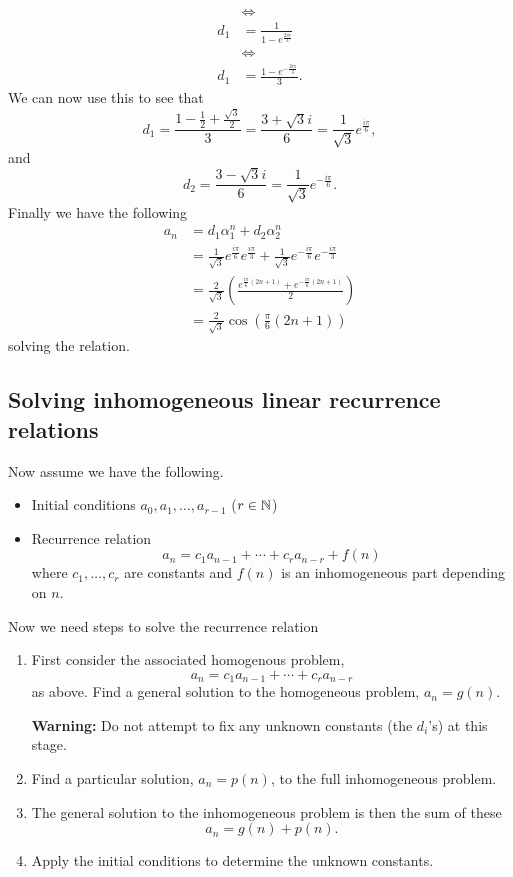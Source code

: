 \documentclass[10pt, a4paper]{article}
\begin{document}
\begin{example}
\begin{solution}
\begin{align*}
            &\iff \\
            d_1 &= \frac{1}{1 - e ^ {\frac{2i\pi}{3}}} \\
            &\iff \\
            d_1 &= \frac{1 - e ^ {-\frac{2i\pi}{3}}}{3}.
        \end{align*}
        We can now use this to see that
        \[
        d_1 = \frac{1 - \frac{1}{2} + \frac{\sqrt{3}}{2}}{3} = \frac{3 + \sqrt{3}i}{6} = \frac{1}{\sqrt{3}}e ^ {\frac{i\pi}{6}},
        \]
        and
        \[
        d_2 = \frac{3 - \sqrt{3}i}{6} = \frac{1}{\sqrt{3}}e ^ {-\frac{i\pi}{6}}.
        \]
        Finally we have the following
        \begin{align*}
            a_n &= d_1\alpha_1 ^ n + d_2\alpha_2 ^ n \\
            &= \frac{1}{\sqrt{3}}e ^ {\frac{i\pi}{6}}e ^ {\frac{i\pi}{3}} + \frac{1}{\sqrt{3}}e ^ {-\frac{i\pi}{6}}e ^ {-\frac{i\pi}{3}} \\
            &= \frac{2}{\sqrt{3}}\left(\frac{e ^ {\frac{i\pi}{6}(2n + 1)} + e ^ {-\frac{i\pi}{6}(2n + 1)}}{2}\right) \\
            &= \frac{2}{\sqrt{3}}\cos\left(\frac{\pi}{6}(2n + 1)\right)
        \end{align*}
        solving the relation.
    \end{solution}
\end{example}

\subsection{Solving inhomogeneous linear recurrence relations}
Now assume we have the following.
\begin{itemize}
    \item Initial conditions $a_0, a_1, \dotsc, a_{r - 1}$ ($r \in \mathbb{N}$)
    \item Recurrence relation
    \[
    a_n = c_1a_{n - 1} + \dotsi + c_ra_{n - r} + f(n)
    \]
    where $c_1, \dotsc, c_r$ are constants and $f(n)$ is an inhomogeneous part depending on $n$.
\end{itemize}

Now we need steps to solve the recurrence relation
\begin{enumerate}[label = \textbf{Step \arabic*}]
    \item First consider the associated homogenous problem,
    \[
    a_n = c_1a_{n - 1} + \dotsi + c_ra_{n - r}
    \]
    as above.
    Find a general solution to the homogeneous problem,
    $a_n = g(n)$.
    
    \textbf{Warning:} Do not attempt to fix any unknown constants
    (the $d_i$'s)
    at this stage.
    \item Find a particular solution,
    $a_n = p(n)$,
    to the full inhomogeneous problem.
    \item The general solution to the inhomogeneous problem is then the sum of these
    \[
    a_n = g(n) + p(n).
    \]
    \item Apply the initial conditions to determine the unknown constants.
\end{enumerate}
\end{document}
